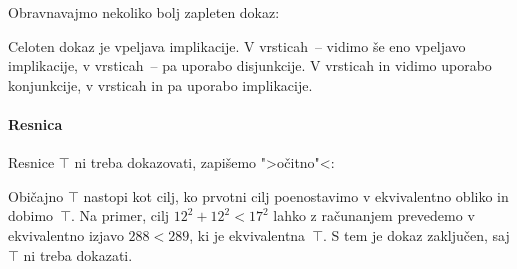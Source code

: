 \begin{zgled}
  Obravnavajmo nekoliko bolj zapleten dokaz:
  \begin{boxDisplay}
  \begin{boxedProof}[numbered]
    \begin{boxFrame}
      \begin{boxNested}[3]
      \end{boxNested}
      \begin{boxNested}[3]
      \end{boxNested}
    \end{boxFrame}
  \end{boxedProof}
  \end{boxDisplay}
  Celoten dokaz je vpeljava implikacije.
  V vrsticah~-- vidimo še eno vpeljavo implikacije,
  v vrsticah~-- pa uporabo disjunkcije.
  V vrsticah  in  vidimo uporabo konjunkcije,
  v vrsticah  in  pa uporabo implikacije.
\end{zgled}

\paragraph*{Resnica}
\label{sec:resnica-pravila}

Resnice $\top$ ni treba dokazovati, zapišemo ">očitno"<:
%
\begin{boxDisplay}
  \begin{boxedProof}
    \begin{boxFrame}
    \end{boxFrame}
  \end{boxedProof}
\end{boxDisplay}
%
Običajno $\top$ nastopi kot cilj, ko prvotni cilj poenostavimo v ekvivalentno obliko in dobimo~$\top$.
%
Na primer, cilj $12^2 + 12^2 < 17^2$ lahko z računanjem prevedemo v ekvivalentno izjavo $288 < 289$, ki je ekvivalentna~$\top$. S tem je dokaz zaključen, saj $\top$ ni treba dokazati.

